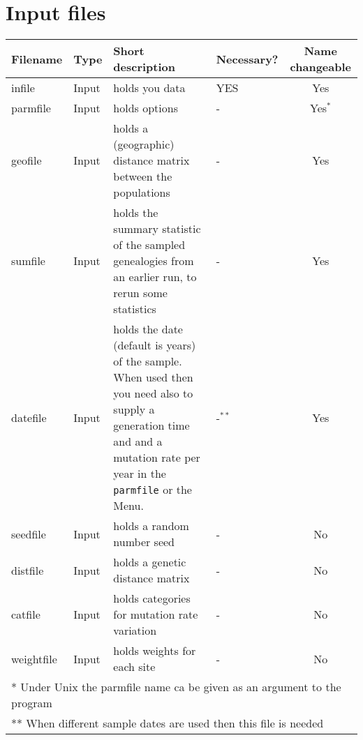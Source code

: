 \section{Input files}
\begin{center}
\begin{tabular}{l l p{7.0cm} l c}
\hline
Filename & Type & Short description & Necessary?  & Name changeable\\
\hline
infile & Input           & {holds you data} & YES & Yes\\
parmfile  & Input       & {holds options} & - & Yes$^{*}$\\
geofile & Input & {holds a (geographic) distance matrix between the populations} & - & Yes\\
sumfile    & Input      & {holds the summary statistic of the sampled  genealogies from an earlier run, to rerun some statistics}& - & Yes\\
\hline
datefile & Input & holds the date (default is years) of the sample. When used then you need also to supply a generation time and and a mutation rate per year in the {\tt parmfile} or the Menu. & -$^{**}$ & Yes\\
\hline
seedfile  & Input       & {holds a random number seed} & - & No\\
distfile & Input      & {holds a genetic distance matrix} & - & No \\
catfile   & Input       & {holds categories for mutation rate variation} & - & No\\
weightfile   & Input     & {holds weights for each site} & - & No\\
\hline
\multicolumn{5}{l}{* Under Unix the parmfile name ca be given as an argument to the program}\\
\multicolumn{5}{l}{** When different sample dates are used then this file is needed}
\end{tabular}
\end{center}
